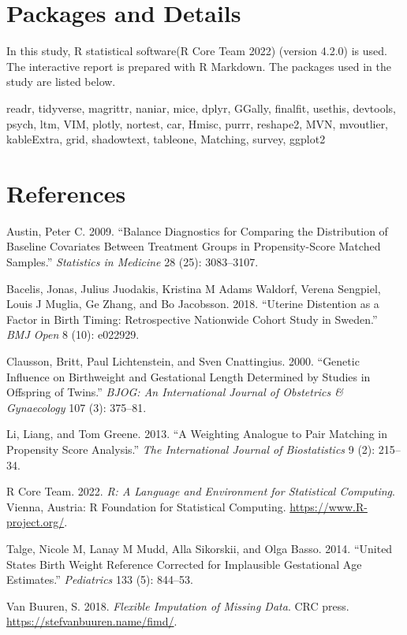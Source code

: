 \documentclass[
]{article}
\newenvironment{Shaded}{\begin{snugshade}}{\end{snugshade}}
\newcommand{\NormalTok}[1]{#1}
\begin{document}
\hypertarget{packages-and-details}{%
\section{Packages and Details}\label{packages-and-details}}

In this study, R statistical software(R Core Team 2022) (version 4.2.0)
is used. The interactive report is prepared with R Markdown. The
packages used in the study are listed below.

\begin{Shaded}
\begin{Highlighting}[]
\NormalTok{readr, tidyverse, magrittr, naniar, mice, dplyr, GGally, finalfit, usethis, devtools, psych, ltm, VIM, plotly, nortest, car, Hmisc, purrr, reshape2, MVN, mvoutlier,  kableExtra, grid, shadowtext,  tableone, Matching, survey, ggplot2}
\end{Highlighting}
\end{Shaded}

\hypertarget{references}{%
\section*{References}\label{references}}

\hypertarget{refs}{}
\leavevmode\hypertarget{ref-austin2009balance}{}%
Austin, Peter C. 2009. ``Balance Diagnostics for Comparing the
Distribution of Baseline Covariates Between Treatment Groups in
Propensity-Score Matched Samples.'' \emph{Statistics in Medicine} 28
(25): 3083--3107.

\leavevmode\hypertarget{ref-bacelis2018uterine}{}%
Bacelis, Jonas, Julius Juodakis, Kristina M Adams Waldorf, Verena
Sengpiel, Louis J Muglia, Ge Zhang, and Bo Jacobsson. 2018. ``Uterine
Distention as a Factor in Birth Timing: Retrospective Nationwide Cohort
Study in Sweden.'' \emph{BMJ Open} 8 (10): e022929.

\leavevmode\hypertarget{ref-clausson2000genetic}{}%
Clausson, Britt, Paul Lichtenstein, and Sven Cnattingius. 2000.
``Genetic Influence on Birthweight and Gestational Length Determined by
Studies in Offspring of Twins.'' \emph{BJOG: An International Journal of
Obstetrics \& Gynaecology} 107 (3): 375--81.

\leavevmode\hypertarget{ref-li2013weighting}{}%
Li, Liang, and Tom Greene. 2013. ``A Weighting Analogue to Pair Matching
in Propensity Score Analysis.'' \emph{The International Journal of
Biostatistics} 9 (2): 215--34.

\leavevmode\hypertarget{ref-r}{}%
R Core Team. 2022. \emph{R: A Language and Environment for Statistical
Computing}. Vienna, Austria: R Foundation for Statistical Computing.
\url{https://www.R-project.org/}.

\leavevmode\hypertarget{ref-talge2014united}{}%
Talge, Nicole M, Lanay M Mudd, Alla Sikorskii, and Olga Basso. 2014.
``United States Birth Weight Reference Corrected for Implausible
Gestational Age Estimates.'' \emph{Pediatrics} 133 (5): 844--53.

\leavevmode\hypertarget{ref-buuren}{}%
Van Buuren, S. 2018. \emph{Flexible Imputation of Missing Data}. CRC
press. \url{https://stefvanbuuren.name/fimd/}.
\end{document}
